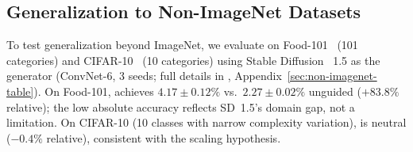 \subsection{Generalization to Non-ImageNet Datasets}
\label{sec:non-imagenet}

To test generalization beyond ImageNet, we evaluate on Food-101~\cite{bossard2014food101} (101 categories) and CIFAR-10~\cite{krizhevsky2009learning} (10 categories) using Stable Diffusion~\cite{rombach2021highresolution} 1.5 as the generator (ConvNet-6, 3 seeds; full details in , Appendix~\ref{sec:non-imagenet-table}). On Food-101, \cags{} achieves $4.17 \pm 0.12\%$ vs.\ $2.27 \pm 0.02\%$ unguided ($+83.8\%$ relative); the low absolute accuracy reflects SD~1.5's domain gap, not a \cags{} limitation. On CIFAR-10 (10 classes with narrow complexity variation), \cags{} is neutral ($-0.4\%$ relative), consistent with the scaling hypothesis.
